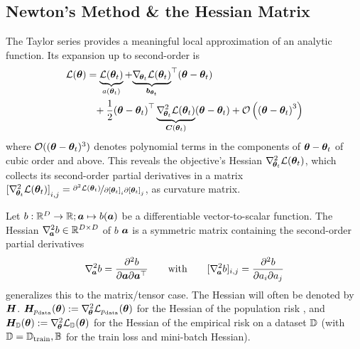 \subsection{Newton's Method \& the Hessian
  Matrix}\label{sec:background::NewtonMethodAndHessian}
The Taylor series provides a meaningful local approximation of an analytic
function. Its expansion up to second-order is
\begin{align}
  \begin{split}
    {\mathcal{L}}({\bm{\theta}})
    &=
      \underbrace{
      {\mathcal{L}}({\bm{\theta}}_t)
      }_{a({\bm{\theta}}_t)}
      +
      {
      \underbrace{
      \nabla_{\!{{\bm{\theta}}_{t}}}{\mathcal{L}}({\bm{\theta}}_t)
      }_{{\bm{b}}_{{\bm{\theta}}_t}}
      }^{\top}
      ( {\bm{\theta}} - {\bm{\theta}}_t)
    \\
    &\phantom{= }
      +
      \frac{1}{2}
      {( {\bm{\theta}} - {\bm{\theta}}_t)}^{\top}
      \underbrace{
      \nabla_{\!{{\bm{\theta}}_t}}^{2}{\mathcal{L}}({\bm{\theta}}_t)
      }_{{\bm{C}}({\bm{\theta}}_t)}
      ( {\bm{\theta}} - {\bm{\theta}}_t)
      +
      {\mathcal{O}}\left( {({\bm{\theta}} - {\bm{\theta}}_t)}^{3} \right)
  \end{split}
\end{align}
where ${\mathcal{O}}(({\bm{\theta}} - {\bm{\theta}}_t)^{3})$ denotes polynomial terms in the
components of ${\bm{\theta}} - {\bm{\theta}}_t$ of cubic order and above. This reveals the
objective's Hessian $\nabla_{\!{{\bm{\theta}}_t}}^{2}{\mathcal{L}}({\bm{\theta}}_t)$, which collects its
second-order partial derivatives in a matrix
${[\nabla_{\!{{\bm{\theta}}_t}}^{2}{\mathcal{L}}({\bm{\theta}}_t)]}_{i,j} = \nicefrac{\partial^2
  {\mathcal{L}}({\bm{\theta}}_t)}{\partial {[{\bm{\theta}}_t]}_i \partial {[{\bm{\theta}}_t]}_j}$, as
curvature matrix.

\begin{definition}\label{def:background::Hessian}
  Let $b: {\mathbb{R}}^D \to {\mathbb{R}}; {\bm{a}} \mapsto b({\bm{a}})$ be a differentiable
  vector-to-scalar function. The Hessian $\nabla_{\!{{\bm{a}}}}^{2} b \in {\mathbb{R}}^{D\times
    D}$ of $b$ \wrt ${\bm{a}}$ is a symmetric matrix containing the second-order
  partial derivatives
  \begin{align}
    \label{eq:background::HessianVectorToScalar}
    \nabla_{\!{{\bm{a}}}}^{2}b = \frac{\partial^2 b}{\partial {\bm{a}} \partial {\bm{a}}^{\top}}
    \qquad
    \text{with}
    \qquad
    [\nabla_{\!{{\bm{a}}}}^{2}b]_{i,j} = \frac{\partial^2 b}{\partial {a}_i \partial {a}_j}
  \end{align}
   generalizes this to the matrix/tensor case.
  The Hessian will often be denoted by ${\bm{H}}$. \Eg ${\bm{H}}_{p_{\mathrm{data}}}({\bm{\theta}}) :=
  \nabla_{\!{{\bm{\theta}}}}^{2} {\mathcal{L}}_{p_{\mathrm{data}}}({\bm{\theta}})$ for the Hessian of the population
  risk , and ${\bm{H}}_{{\mathbb{D}}}({\bm{\theta}}) :=
  \nabla_{\!{{\bm{\theta}}}}^{2} {\mathcal{L}}_{{\mathbb{D}}}({\bm{\theta}})$ for the Hessian of the empirical
  risk  on a dataset ${\mathbb{D}}$ (with ${\mathbb{D}} =
  {\mathbb{D}}_{\mathrm{train}},{\mathbb{B}}$ for the train loss and mini-batch Hessian).
\end{definition}


